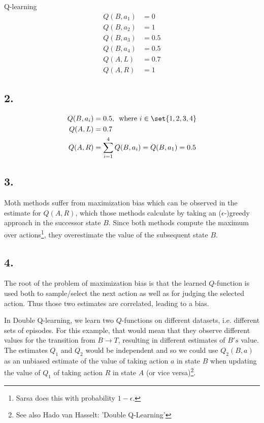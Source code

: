 \documentclass{article}
\begin{document}
Q-learning
\begin{align*}
Q(B, a_1) &= 0\\
Q(B, a_2) &= 1\\
Q(B, a_3) &= 0.5\\
Q(B, a_4) &= 0.5\\
Q(A, L) &=  0.7\\
Q(A, R) &=  1
\end{align*}



\subsection*{2.}
\begin{align*}
Q(B, a_i) &= 0.5 ,\, \text{ where  }i\in\set{1,2,3,4}\\
Q(A, L) &= 0.7\\
Q(A, R) &= \sum_{i=1}^4 Q(B,a_i) = Q(B,a_1) = 0.5
\end{align*}


\subsection*{3.}
Moth methods suffer from maximization bias which can be observed in the estimate for $Q(A,R)$, which those methods calculate by taking an ($\epsilon$-)greedy approach in the successor state $B$. Since both methods compute the maximum over actions\footnote{Sarsa does this with probability $1-\epsilon$.}, they overestimate the value of the subsequent state $B$.


\subsection*{4.}
The root of the problem of maximization bias is that the learned $Q$-function is used both to sample/select the next action as well as for judging the selected action. Thus those two estimates are correlated, leading to a bias. 

In Double Q-learning, we learn two $Q$-functions on different datasets, i.e. different sets of episodes. For this example, that would mean that they observe different values for the transition from $B\to T$, resulting in different estimates of $B's$ value. The estimates $Q_1$ and $Q_2$ would be independent and so we could use $Q_2(B, a)$ as an unbiased estimate of the value of taking action $a$ in state $B$ when updating the value of $Q_1$ of taking action $R$ in state $A$ (or vice versa)\footnote{See also {Hado van Hasselt: 'Double Q-Learning'}}.

 
\end{document}

